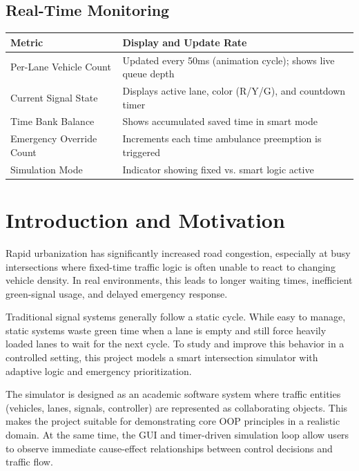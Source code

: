 \documentclass[12pt,a4paper]{article}
\begin{document}
\subsection{Real-Time Monitoring}
\begin{table}[h]
    \centering
    \begin{tabularx}{\textwidth}{|l|X|}
        \hline
        \textbf{Metric} & \textbf{Display and Update Rate} \\ \hline
        Per-Lane Vehicle Count & Updated every 50ms (animation cycle); shows live queue depth \\ \hline
        Current Signal State & Displays active lane, color (R/Y/G), and countdown timer \\ \hline
        Time Bank Balance & Shows accumulated saved time in smart mode \\ \hline
        Emergency Override Count & Increments each time ambulance preemption is triggered \\ \hline
        Simulation Mode & Indicator showing fixed vs. smart logic active \\ \hline
    \end{tabularx}
\end{table}

\newpage
\section{Introduction and Motivation}
Rapid urbanization has significantly increased road congestion, especially at busy intersections where fixed-time traffic logic is often unable to react to changing vehicle density. In real environments, this leads to longer waiting times, inefficient green-signal usage, and delayed emergency response.

Traditional signal systems generally follow a static cycle. While easy to manage, static systems waste green time when a lane is empty and still force heavily loaded lanes to wait for the next cycle. To study and improve this behavior in a controlled setting, this project models a smart intersection simulator with adaptive logic and emergency prioritization.

The simulator is designed as an academic software system where traffic entities (vehicles, lanes, signals, controller) are represented as collaborating objects. This makes the project suitable for demonstrating core OOP principles in a realistic domain. At the same time, the GUI and timer-driven simulation loop allow users to observe immediate cause-effect relationships between control decisions and traffic flow.
\end{document}
